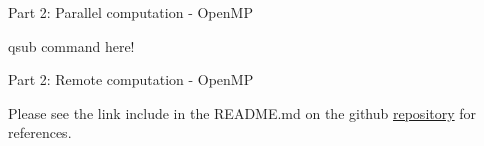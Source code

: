 \documentclass[11pt, twoside]{article}
\begin{document}
\noindent



\begin{center}
	\color{MidnightBlue} {\Large Part 2: Parallel computation - OpenMP }\color{Black} 
\end{center}


qsub command here!

\begin{center}
	\color{MidnightBlue} {\Large Part 2: Remote computation - OpenMP }\color{Black} 
\end{center}






\vspace{1cm}
\noindent
Please see the link include in the README.md on the github \href{https://github.com/SebastianoF/game_of_life}{repository} for references.
\end{document}
